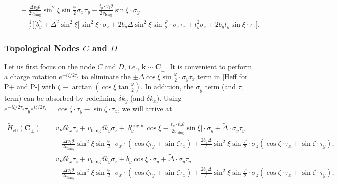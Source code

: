 \begin{subappendices}
\begin{align}
		                           & \quad-\frac{\Delta v_2\theta}{2v_{\text{Ising}}}\sin^2\xi\sin\frac{\varphi}{2}\sigma_x\tau_y-\frac{t_y\cdot v_2\theta}{2v_{\text{Ising}}}\sin\xi\cdot\sigma_y\nonumber                                                          \\
		                           & \quad\pm\frac{1}{\Gamma}\Big[\big[b_y^2+\Delta^2\sin^2\xi\big]\sin^2\xi\cdot\sigma_z\pm2b_y\Delta\sin^2\xi\sin\frac{\varphi}{2}\cdot\sigma_z\tau_x+t_y^2\sigma_z\mp 2b_y t_y \sin\xi\cdot\tau_z\Big]\label{Heff for P+ and P-}.
	\end{align}

	\subsubsection{Topological Nodes $C$ and $D$}
	Let us first focus on the node $C$ and $D$, i.e., $\bm{k}\sim\bm{C}_\pm$. It is convenient to perform a charge rotation $e^{\pm i\zeta/2\tau_z}$ to eliminate the $\pm\Delta\cos\xi\sin\frac{\varphi}{2}\cdot\sigma_y\tau_x$ term in \eqref{Heff for P+ and P-} with $\zeta\equiv\arctan(\cos\xi\tan\frac{\varphi}{2})$. In addition, the $\sigma_y$ term (and $\tau_z$ term) can be absorbed by redefining $\delta k_y$ (and $\delta k_x$). Using $e^{-i\zeta/2\tau_z}\tau_y e^{i\zeta/2\tau_z}=\cos\zeta\cdot\tau_y-\sin\zeta\cdot\tau_x$, we will arrive at

	\begin{align}
		\widetilde{H}_{\text{eff}}(\bm{C}_\pm) & =v_F\delta k_x \tau_z+v_{\text{Ising}}\delta k_y \sigma_z+\Big[b_y^{\text{origin.}}\cos\xi-\frac{t_y\cdot v_2\theta}{2v_{\text{Ising}}}\sin\xi\Big]\cdot\sigma_y+\tilde\Delta\cdot\sigma_y\tau_y\nonumber                                                                               \\
		                                       & \quad-\frac{\Delta v_2\theta}{2v_{\text{Ising}}}\sin^2\xi\sin\frac{\varphi}{2}\cdot\sigma_x\cdot(\cos\zeta\tau_y\mp\sin\zeta\tau_x)+\frac{2b_y\Delta}{\Gamma}\sin^2\xi\sin\frac{\varphi}{2}\cdot\sigma_z(\cos\zeta\cdot\tau_x\pm \sin\zeta\cdot\tau_y),\nonumber                        \\
		                                       & =v_F\delta k_x \tau_z+v_{\text{Ising}}\delta k_y \sigma_z+b_y\cos\xi\cdot\sigma_y+\widetilde\Delta\cdot\sigma_y\tau_y\nonumber                                                                                                                                                          \\
		                                       & \quad-\frac{\Delta v_2\theta}{2v_{\text{Ising}}}\sin^2\xi\sin\frac{\varphi}{2}\cdot\sigma_x\cdot(\cos\zeta\tau_y\mp\sin\zeta\tau_x)+\frac{2b_y\Delta}{\Gamma}\sin^2\xi\sin\frac{\varphi}{2}\cdot\sigma_z(\cos\zeta\cdot\tau_x\pm \sin\zeta\cdot\tau_y)\label{Heff_tilde for P+ and P-},
	\end{align}


\end{subappendices}
